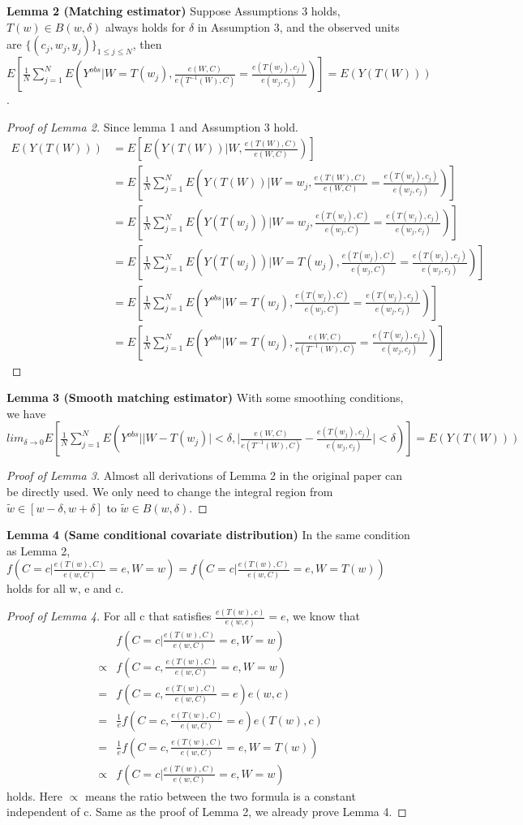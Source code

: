 \noindent \textbf{Lemma 2 (Matching estimator)} Suppose Assumptions 3 holds, $T(w) \in B(w,\delta)$ always holds for $\delta$ in Assumption 3, and the observed units are $\{(c_j,w_j,y_j)\}_{1\leq j \leq N}$, then $E[\frac{1}{N}\sum_{j=1}^NE(Y^{obs}|W=T(w_j),\frac{e(W,C)}{e(T^{-1}(W),C)}=\frac{e(T(w_j),c_j)}{e(w_j,c_j)})]=E(Y(T(W)))$. 

\begin{proof}[Proof of Lemma 2] Since lemma 1 and Assumption 3 hold. 
\begin{align*}
    E(Y(T(W)))&=E[E(Y(T(W))|W,\frac{e(T(W),C)}{e(W,C)})]\\
    &=E[\frac{1}{N}\sum_{j=1}^NE(Y(T(W))|W=w_j,\frac{e(T(W),C)}{e(W,C)}=\frac{e(T(w_j),c_j)}{e(w_j,c_j)})]\\
    &=E[\frac{1}{N}\sum_{j=1}^NE(Y(T(w_j))|W=w_j,\frac{e(T(w_j),C)}{e(w_j,C)}=\frac{e(T(w_j),c_j)}{e(w_j,c_j)})]\\
    &=E[\frac{1}{N}\sum_{j=1}^NE(Y(T(w_j))|W=T(w_j),\frac{e(T(w_j),C)}{e(w_j,C)}=\frac{e(T(w_j),c_j)}{e(w_j,c_j)})]\\
    &=E[\frac{1}{N}\sum_{j=1}^NE(Y^{obs}|W=T(w_j),\frac{e(T(w_j),C)}{e(w_j,C)}=\frac{e(T(w_j),c_j)}{e(w_j,c_j)})]\\
    &=E[\frac{1}{N}\sum_{j=1}^NE(Y^{obs}|W=T(w_j),\frac{e(W,C)}{e(T^{-1}(W),C)}=\frac{e(T(w_j),c_j)}{e(w_j,c_j)})]
\end{align*}
\end{proof}
\noindent \textbf{Lemma 3 (Smooth matching estimator)} With some smoothing conditions, we have $lim_{\delta \to 0}E[\frac{1}{N}\sum_{j=1}^NE(Y^{obs}||W-T(w_j)|<\delta,|\frac{e(W,C)}{e(T^{-1}(W),C)}-\frac{e(T(w_j),c_j)}{e(w_j,c_j)}|<\delta)]=E(Y(T(W)))$
\begin{proof}[Proof of Lemma 3] 
Almost all derivations of Lemma 2 in the original paper can be directly used. We only need to change the integral region from $\tilde{w} \in [w-\delta,w+\delta]$ to $\tilde{w} \in B(w,\delta)$.
\end{proof}

\noindent \textbf{Lemma 4 (Same conditional covariate distribution)} In the same condition as Lemma 2, $f(C=c|\frac{e(T(w),C)}{e(w,C)}=e,W=w)=f(C=c|\frac{e(T(w),C)}{e(w,C)}=e,W=T(w))$ holds for all w, e and c. 
\begin{proof}[Proof of Lemma 4] 
For all c that satisfies $\frac{e(T(w),c)}{e(w,c)}=e$, we know that
\begin{align*}
    &f(C=c|\frac{e(T(w),C)}{e(w,C)}=e,W=w)\\
    \propto&f(C=c,\frac{e(T(w),C)}{e(w,C)}=e,W=w)\\
    =&f(C=c,\frac{e(T(w),C)}{e(w,C)}=e)e(w,c)\\
    =&\frac{1}{e}f(C=c,\frac{e(T(w),C)}{e(w,C)}=e)e(T(w),c)\\
    =&\frac{1}{e}f(C=c,\frac{e(T(w),C)}{e(w,C)}=e,W=T(w))\\
    \propto&f(C=c|\frac{e(T(w),C)}{e(w,C)}=e,W=w)
\end{align*}
holds. Here $\propto$ means the ratio between the two formula is a constant independent of c. Same as the proof of Lemma 2, we already prove Lemma 4.
\end{proof}